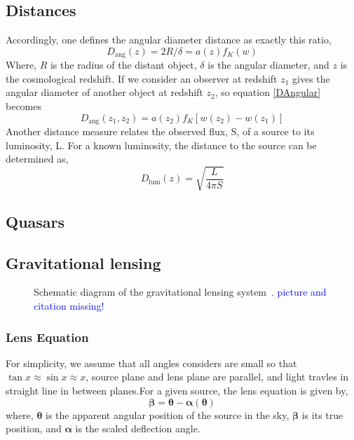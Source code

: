   \subsection{Distances}
  Accordingly, one defines the angular diameter distance as exactly this ratio,
  \begin{equation}
  	D_\text{ang}(z)=2R/\delta=a(z)f_{K}(w)
  \label{DAngular}
  \end{equation}
  \noindent
  Where, $R$ is the radius of the distant object, $\delta$ is the angular diameter, and $z$ is the cosmological redshift. If we consider an observer at redshift $ z_{1} $ gives the angular diameter of another object at redshift $ z_{2} $, so equation \ref{DAngular} becomes
  \begin{equation}
  D_\text{ang}(z_{1},z_{2})=a(z_{2})f_{K}[w(z_{2}) - w(z_{1})]
  \label{math:Dangular2}
  \end{equation}
  Another distance measure relates the observed flux, S, of a source to its luminosity, L. For a known luminosity, the distance to the source can be determined as,
  \begin{equation}
  D_\text{lum}(z)=\sqrt{\frac{L}{4\pi S}}
  \end{equation}
  
  \subsection{Quasars}
  
  \subsection{Gravitational lensing}
  
  \begin{figure}[ht]
  	\centering
   \caption{Schematic diagram of the gravitational lensing system~\cite{wiki}. \textcolor{blue}{picture and citation missing!}}%
  	\label{fig:lensing}
  \end{figure}
  
\subsubsection{Lens Equation}
For simplicity, we assume that all angles considers are small so that $\tan x \approx \sin x \approx x$, source plane and lens plane are parallel, and light travles in straight line in between planes.For a given source, the lens equation is given by,
\begin{equation}
\pmb\beta = \pmb\theta - \pmb\alpha (\pmb\theta)
\label{LEquation}
\end{equation}
\noindent
where, $\pmb\theta$ is the apparent angular position of the source in the sky, $\pmb\beta$ is its true position, and $\pmb\alpha $ is the scaled deflection angle.

